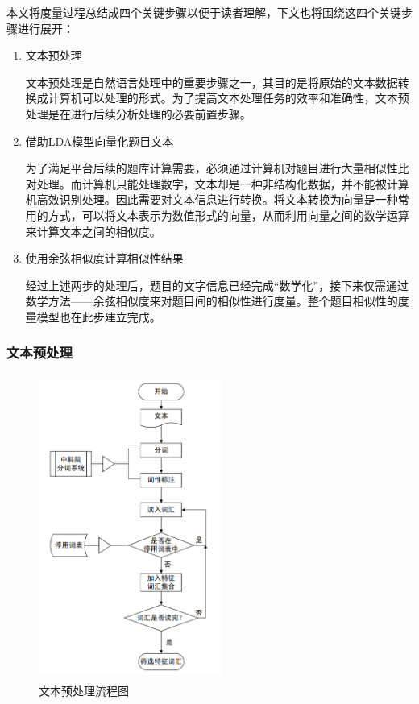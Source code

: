 本文将度量过程总结成四个关键步骤以便于读者理解，下文也将围绕这四个关键步骤进行展开：

\begin{enumerate}
    \item 文本预处理
    
    文本预处理是自然语言处理中的重要步骤之一，其目的是将原始的文本数据转换成计算机可以处理的形式。为了提高文本处理任务的效率和准确性，文本预处理是在进行后续分析处理的必要前置步骤。

    \item 借助LDA模型向量化题目文本
    
    为了满足平台后续的题库计算需要，必须通过计算机对题目进行大量相似性比对处理。而计算机只能处理数字，文本却是一种非结构化数据，并不能被计算机高效识别处理。因此需要对文本信息进行转换。将文本转换为向量是一种常用的方式，可以将文本表示为数值形式的向量，从而利用向量之间的数学运算来计算文本之间的相似度。

    \item 使用余弦相似度计算相似性结果
    
    经过上述两步的处理后，题目的文字信息已经完成“数学化”，接下来仅需通过数学方法——余弦相似度来对题目间的相似性进行度量。整个题目相似性的度量模型也在此步建立完成。
\end{enumerate}

\subsubsection{文本预处理}

\begin{figure}[htbp]
    \centering
    \label{photo041944}
    \includegraphics[width=6cm,height=10cm]{res/Text preprocessing process.png}
    \caption{文本预处理流程图}
\end{figure} 

